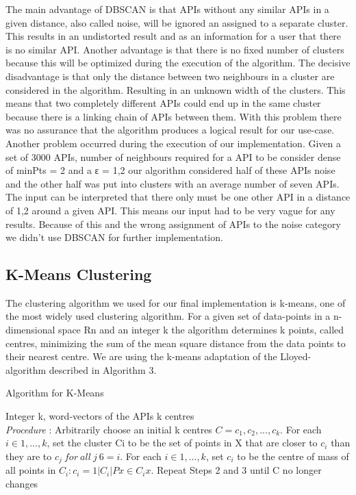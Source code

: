 \documentclass[a4paper]{IEEEtran}
\begin{document}
The main advantage of DBSCAN is that APIs without any similar APIs in a given distance, also called noise, will be ignored an assigned to a separate cluster. This results in an undistorted result and as an information for a user that there is no similar API. 
Another advantage is that there is no fixed number of clusters because this will be optimized during the execution of the algorithm.
The decisive disadvantage is that only the distance between two neighbours in a cluster are considered in the algorithm. Resulting in an unknown width of the clusters. This means that two completely different APIs could end up in the same cluster because there is a linking chain of APIs between them. With this problem there was no assurance that the algorithm produces a logical result for our use-case.
Another problem occurred during the execution of our implementation. Given a set of 3000 APIs, number of neighbours required for a API to be consider dense of minPts = 2 and a ε = 1,2 our algorithm considered half of these APIs noise and the other half was put into clusters with an average number of seven APIs. The input can be interpreted that there only must be one other API in a distance of 1,2 around a given API. This means our input had to be very vague for any results. Because of this and the wrong assignment of APIs to the noise category we didn’t use DBSCAN for further implementation.


\subsection{K-Means Clustering}
The clustering algorithm we used for our final implementation is k-means, one of the most widely used clustering algorithm. For a given set of data-points in a n-dimensional space Rn and an integer k the algorithm determines k points, called centres, minimizing the sum of the mean square distance from the data points to their nearest centre. We are using the k-means adaptation of the Lloyed-algorithm described in Algorithm 3.

\begin{algorithm}[H]
 \caption{Algorithm for K-Means}
 \begin{algorithmic}[1]
\renewcommand{\algorithmicrequire}{\textbf{Input:}}
 \renewcommand{\algorithmicensure}{\textbf{Output:}}
 \REQUIRE Integer k, word-vectors of the APIs
 \ENSURE  k centres
 \\ \textit{Procedure} :
  \STATE Arbitrarily choose an initial k centres $C = {c_1, c_2, ..., c_k}$.
 \STATE For each $i \in {1, ..., k}$, set the cluster Ci to be the set of points in X that are closer to $c_i$ than
they are to $c_j~for ~all ~j ~6= i$.
\STATE For each $i \in {1, . . . , k}$, set $c_i$ to be the centre of mass of all points in $C_i : c_i = 1 |C_i| P x \in C_i x$.
\STATE Repeat Steps 2 and 3 until C no longer changes %

 \end{algorithmic}
 \end{algorithm}
\end{document}
